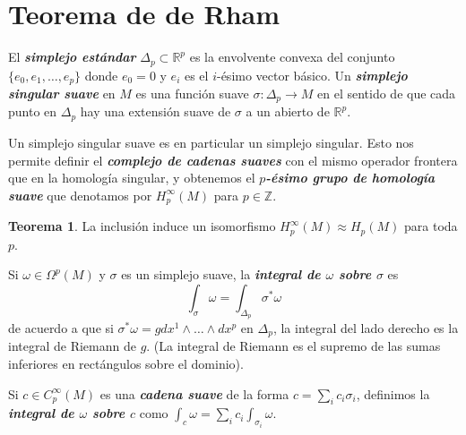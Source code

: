 \documentclass[spanish]{article}
\theoremstyle{definition}
\newtheorem*{teo}{Teorema}
\newcommand{\R}{\mathbb{R}}
\newcommand{\Z}{\mathbb{Z}}
\begin{document}
	\section{Teorema de de Rham}\label{sec:5}
	
	El \textbf{\textit{simplejo estándar}} $\Delta_p\subset\R^p$ es la envolvente convexa del conjunto $\{e_0,e_1,\ldots,e_p\}$ donde $e_0=0$ y $e_i$ es el $i$-ésimo vector básico. Un \textbf{\textit{simplejo singular suave}} en $M$ es una función suave $\sigma:\Delta_p\to M$ en el sentido de que cada punto en $\Delta_p$ hay una extensión suave de $\sigma$ a un abierto de $\R^p$.
	
	Un simplejo singular suave es en particular un simplejo singular. Esto nos permite definir el \textbf{\textit{complejo de cadenas suaves}} con el mismo operador frontera que en la homología singular, y obtenemos el \textbf{\textit{$p$-ésimo grupo de homología suave}} que denotamos por $H^\infty_p(M)$ para $p\in\Z$.
	\begin{teo}
		La inclusión induce un isomorfismo $H^\infty_p(M)\approx H_p(M)$ para toda $p$.
	\end{teo}
	
	Si $\omega\in\Omega^p(M)$ y $\sigma$ es un simplejo suave, la \textbf{\textit{integral de $\omega$ sobre $\sigma$}} es
	\[\int_\sigma \omega=\int_{\Delta_p}\sigma^*\omega\]
	de acuerdo a que si $\sigma^*\omega=gdx^1\wedge\ldots\wedge dx^p$ en $\Delta_p$, la integral del lado derecho es la integral de Riemann de $g$. (La integral de Riemann es el supremo de las sumas inferiores en rectángulos sobre el dominio).
	
	Si $c\in C_p^\infty(M)$ es una \textbf{\textit{cadena suave}} de la forma $c=\sum_ic_i\sigma_i$, definimos la \textbf{\textit{integral de $\omega$ sobre $c$}} como $\int_c\omega=\sum_ic_i\int_{\sigma_i}\omega$.
	
\end{document}
